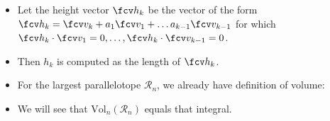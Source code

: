 \begin{frame}
\begin{itemize}
\item<8-> Let the height vector $\fcv h_k$ be the vector of the form $\fcv h_k =\fcv v_k+a_1\fcv v_1 +\dots a_{k-1}\fcv v_{k-1}$ for which $\fcv h_k\cdot \fcv v_1 =0,\dots, \fcv h_k\cdot \fcv v_{k-1}=0$.
\item<9-> Then $h_k$ is computed as the length of $\fcv h_k$.
\item<10-> For the largest parallelotope $\mathcal R_n$, we already have definition of volume:  
\item<12-> We will see that $ \text{Vol}_n (\mathcal R_n) $ equals that integral.
\end{itemize}
\end{frame}

